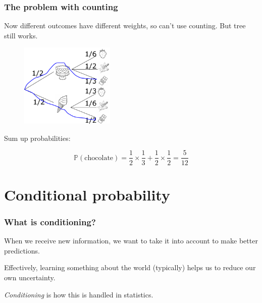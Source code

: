 \documentclass{beamer}
\begin{document}
	\begin{frame}
		\frametitle{The problem with counting}
		
		Now different outcomes have different weights, so can't use counting. But tree still works.
		
		\begin{figure}[ht]
			\centerline{\includegraphics[width=0.4\textwidth]{./figures/tree-prob-choc-2.pdf}}
		\end{figure}
		
		Sum up probabilities:
		
		\begin{equation}
			\mathbb{P}(\text{chocolate}) = \frac{1}{2} \times \frac{1}{3} +  \frac{1}{2} \times \frac{1}{2} = \frac{5}{12}
		\end{equation}
		
	\end{frame}


	\section{Conditional probability}
	\frame{\tableofcontents[currentsection]}
	
	\begin{frame}
		\frametitle{What is conditioning?}
		
		When we receive new information, we want to take it into account to make better predictions.
		
		\vspace{0.5cm}
		
		Effectively, learning something about the world (typically) helps us to reduce our own uncertainty.
		
		\vspace{0.5cm}
		
		\textit{Conditioning} is how this is handled in statistics.
		
	\end{frame}
\end{document}
